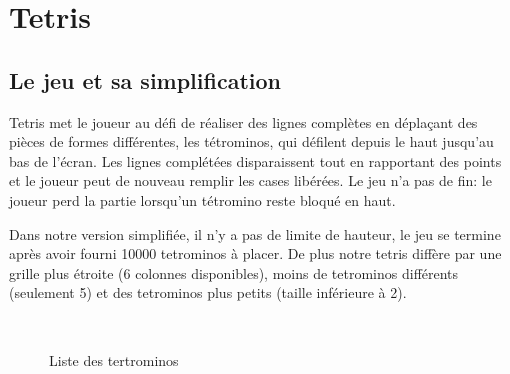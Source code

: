 \documentclass{report}
\begin{document}
\chapter{Tetris}

\section{Le jeu et sa simplification}
Tetris met le joueur au défi de réaliser des lignes complètes en déplaçant des
pièces de formes différentes, les tétrominos, qui défilent depuis le haut
jusqu'au bas de l'écran. Les lignes complétées disparaissent tout en rapportant
des points et le joueur peut de nouveau remplir les cases libérées. Le jeu
n'a pas de fin: le joueur perd la partie lorsqu'un tétromino reste bloqué en
haut.

Dans notre version simplifiée, il n'y a pas de limite de hauteur, le jeu se
termine après avoir fourni 10000 tetrominos à placer. De plus notre
tetris diffère par une grille plus étroite (6 colonnes disponibles), moins de
tetrominos différents (seulement 5) et des tetrominos plus petits (taille
inférieure à 2).

\begin{figure}[h]
  \centering
  \qquad
  \qquad
  \\
  \qquad
  \caption{Liste des tertrominos}\label{fig:tetrolist}
\end{figure}
\end{document}
